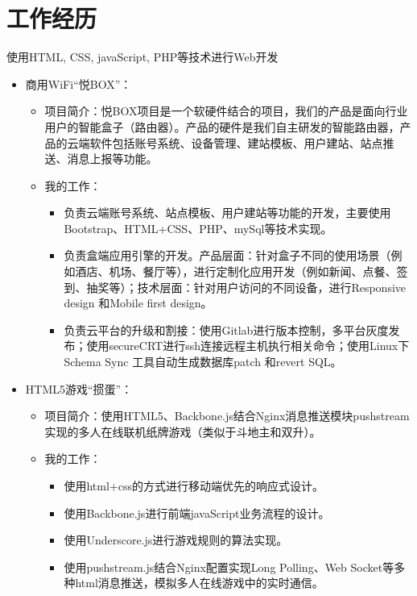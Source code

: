 \documentclass[11pt,a4paper,sans]{moderncv}        %
\begin{document}
\section{工作经历}
{使用HTML, CSS, javaScript, PHP等技术进行Web开发
\newline{}%
\begin{itemize}%
\item 商用WiFi“悦BOX”：
  \begin{itemize}%
  \item 项目简介：悦BOX项目是一个软硬件结合的项目，我们的产品是面向行业用户的智能盒子（路由器）。产品的硬件是我们自主研发的智能路由器，产品的云端软件包括账号系统、设备管理、建站模板、用户建站、站点推送、消息上报等功能。
  \item 我的工作：
      \begin{itemize}%
        \item 负责云端账号系统、站点模板、用户建站等功能的开发，主要使用Bootstrap、HTML+CSS、PHP、mySql等技术实现。
        \item 负责盒端应用引擎的开发。产品层面：针对盒子不同的使用场景（例如酒店、机场、餐厅等），进行定制化应用开发（例如新闻、点餐、签到、抽奖等）；技术层面：针对用户访问的不同设备，进行Responsive design 和Mobile first design。
        \item 负责云平台的升级和割接：使用Gitlab进行版本控制，多平台灰度发布；使用secureCRT进行ssh连接远程主机执行相关命令；使用Linux下Schema Sync 工具自动生成数据库patch 和revert SQL。
      \end{itemize}
  \end{itemize}
\item HTML5游戏“掼蛋”：
  \begin{itemize}%
  \item 项目简介：使用HTML5、Backbone.js结合Nginx消息推送模块pushstream实现的多人在线联机纸牌游戏（类似于斗地主和双升）。
  \item 我的工作：
      \begin{itemize}%
        \item 使用html+css的方式进行移动端优先的响应式设计。
        \item 使用Backbone.js进行前端javaScript业务流程的设计。
        \item 使用Underscore.js进行游戏规则的算法实现。
        \item 使用pushstream.js结合Nginx配置实现Long Polling、Web Socket等多种html消息推送，模拟多人在线游戏中的实时通信。

\end{itemize}
\end{itemize}
\end{itemize}}
\end{document}
